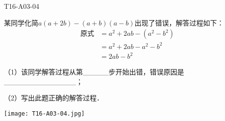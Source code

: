 \begin{defproblem}{T16-A03-04}%
\begin{onlyproblem}%
某同学化简$a(a+2b)-(a+b)(a-b)$出现了错误，解答过程如下：
\begin{align*}
\text{原式}&=a^{2}+2ab-(a^{2}-b^{2})\tag*{（第一步）}\\
&=a^{2}+2ab-a^{2}-b^{2}\tag*{（第二步）}\\
&=2ab-b^{2}\tag*{（第三步）}
\end{align*}

（1）该同学解答过程从第{\_}{\_}{\_}{\_}{\_}步开始出错，错误原因是{\_}{\_}{\_}{\_}{\_}{\_}{\_}{\_}{\_}{\_}{\_}{\_}{\_}{\_}；

（2）写出此题正确的解答过程．
\end{onlyproblem}%
\begin{onlysolution}%
\begin{center}
\texttt{[image: T16-A03-04.jpg]}
\end{center}
\end{onlysolution}%
\end{defproblem}


